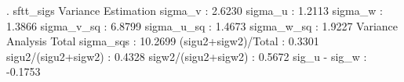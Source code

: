 . sftt_sigs
{\smallskip}
               Variance Estimation          
sigma_v    :       2.6230
sigma_u    :       1.2113
sigma_w    :       1.3866
sigma_v_sq :       6.8799
sigma_u_sq :       1.4673
sigma_w_sq :       1.9227
               Variance Analysis          
Total sigma_sqs     :  10.2699
(sigu2+sigw2)/Total :  0.3301
sigu2/(sigu2+sigw2) :  0.4328
sigw2/(sigu2+sigw2) :  0.5672
sig_u - sig_w       : -0.1753
